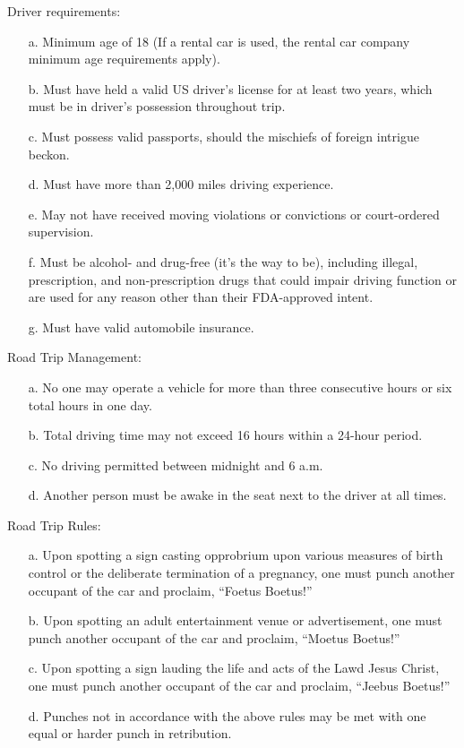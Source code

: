\documentclass{book}
\begin{document}
\begin{enumerate}
 Driver requirements:
    \begin{enumerate}
    \item[a.] Minimum age of 18 (If a rental car is used, the rental car
   company minimum age requirements apply).
   \item[b.] Must have held a valid US driver's license for at least two years, which must 
   be in driver's possession throughout trip.
   \item[c.] Must possess valid passports, should the mischiefs of foreign intrigue beckon.  
   \item[d.] Must have more than 2,000 miles driving experience.
   \item[e.] May not have received moving violations or convictions or
   court-ordered supervision.
   \item[f.] Must be alcohol- and drug-free (it's the way to be), including
   illegal, prescription, and non-prescription drugs that could impair driving function or are used for any reason other than their FDA-approved intent.
   \item[g.] Must have valid automobile insurance.
   \end{enumerate}
 Road Trip Management:
    \begin{enumerate}
    \item[a.] No one may operate a vehicle for more than three consecutive
   hours or six total hours in one day.
   \item[b.] Total driving time may not exceed 16 hours within a 24-hour
   period.
   \item[c.] No driving permitted between midnight and 6 a.m.
   \item[d.] Another person must be awake in the seat next to the driver at
   all times.
\end{enumerate}
    Road Trip Rules:
    \begin{enumerate}
    \item[a.] Upon spotting a sign casting opprobrium upon various measures of birth control or the deliberate termination of a pregnancy, one must punch another occupant of the car and proclaim, ``Foetus Boetus!''
    \item[b.] Upon spotting an adult entertainment venue or advertisement, one must punch another occupant of the car and proclaim, ``Moetus Boetus!''
    \item[c.] Upon spotting a sign lauding the life and acts of the Lawd Jesus Christ, one must punch another occupant of the car and proclaim, ``Jeebus Boetus!''
    \item[d.] Punches not in accordance with the above rules may be met with one equal or harder punch in retribution.
 \end{enumerate}
 

\end{enumerate}
\end{document}
